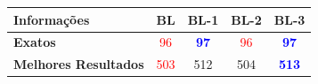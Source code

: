 \begin{tabular}{lcccc}
\hline
\rowcolor{gray!30} \textbf{Informações} &  \textbf{BL} &  \textbf{BL-1} &  \textbf{BL-2} &  \textbf{BL-3}\\ \hline
\textbf{Exatos} & \textcolor{red}{96} & \textbf{\textcolor{blue}{97}}  & \textcolor{red}{96} & \textbf{\textcolor{blue}{97}} \\
\textbf{Melhores Resultados} & \textcolor{red}{503} & 512 & 504 & \textbf{\textcolor{blue}{513}} \\
\hline
\end{tabular}